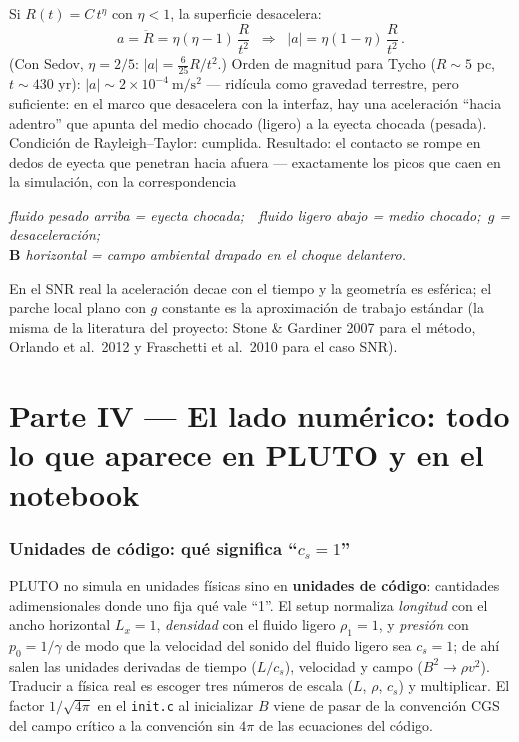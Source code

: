\documentclass[11pt,a4paper]{article}
\newcommand{\B}{\mathbf{B}}
\newcommand{\code}[1]{\texttt{#1}}
\newcommand{\term}[1]{\textbf{#1}}
\begin{document}
Si $R(t)=C\,t^\eta$ con $\eta<1$, la superficie desacelera:
\begin{equation}
a = \ddot{R} = \eta(\eta-1)\,\frac{R}{t^2}
\;\;\Rightarrow\;\;
|a| = \eta(1-\eta)\,\frac{R}{t^2}\,.
\end{equation}
(Con Sedov, $\eta=2/5$: $|a|=\tfrac{6}{25}R/t^2$.) Orden de magnitud para Tycho
($R\sim5$ pc, $t\sim430$ yr): $|a|\sim2\times10^{-4}\ \mathrm{m/s^2}$ --- ridícula como
gravedad terrestre, pero suficiente: en el marco que desacelera con la interfaz, hay una
aceleración ``hacia adentro'' que apunta del medio chocado (ligero) a la eyecta chocada
(pesada). Condición de Rayleigh--Taylor: cumplida. Resultado: el contacto se rompe en
dedos de eyecta que penetran hacia afuera --- exactamente los picos que caen en la
simulación, con la correspondencia
\begin{center}
\emph{fluido pesado arriba = eyecta chocada;\ \ fluido ligero abajo = medio chocado;\
$g$ = desaceleración;}
\\ \emph{$\B$ horizontal = campo ambiental drapado en el choque delantero.}
\end{center}
En el SNR real la aceleración decae con el tiempo y la geometría es esférica; el parche
local plano con $g$ constante es la aproximación de trabajo estándar (la misma de la
literatura del proyecto: Stone \& Gardiner 2007 para el método, Orlando et al.\ 2012 y
Fraschetti et al.\ 2010 para el caso SNR).

\part*{Parte IV --- El lado numérico: todo lo que aparece en PLUTO y en el notebook}
\addcontentsline{toc}{section}{Parte IV --- El lado numérico}

\section{Unidades de código: qué significa ``$c_s=1$''}
\label{sec:unidades}

PLUTO no simula en unidades físicas sino en \term{unidades de código}: cantidades
adimensionales donde uno fija qué vale ``1''. El setup normaliza
\emph{longitud} con el ancho horizontal $L_x=1$, \emph{densidad} con el fluido ligero
$\rho_1=1$, y \emph{presión} con $p_0=1/\gamma$ de modo que la velocidad del sonido del
fluido ligero sea $c_s=1$; de ahí salen las unidades derivadas de tiempo ($L/c_s$),
velocidad y campo ($B^2\to\rho v^2$). Traducir a física real es escoger tres números de
escala ($L$, $\rho$, $c_s$) y multiplicar. El factor $1/\sqrt{4\pi}$ en el \code{init.c}
al inicializar $B$ viene de pasar de la convención CGS del campo crítico a la convención
sin $4\pi$ de las ecuaciones del código.
\end{document}
